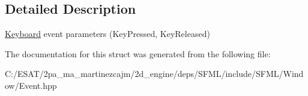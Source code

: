 \subsection{Detailed Description}
\hyperlink{classsf_1_1_keyboard}{Keyboard} event parameters (Key\+Pressed, Key\+Released) 

The documentation for this struct was generated from the following file\+:\begin{DoxyCompactItemize}
\item 
C\+:/\+E\+S\+A\+T/2pa\+\_\+ma\+\_\+martinezcajm/2d\+\_\+engine/deps/\+S\+F\+M\+L/include/\+S\+F\+M\+L/\+Window/Event.\+hpp\end{DoxyCompactItemize}
